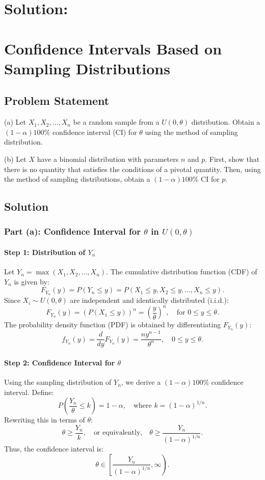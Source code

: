 \documentclass{article}
\begin{document}
\section*{Solution:}


\section*{Confidence Intervals Based on Sampling Distributions}

\subsection*{Problem Statement}
(a) Let \( X_1, X_2, \ldots, X_n \) be a random sample from a \( U(0, \theta) \) distribution. Obtain a \((1-\alpha)100\%\) confidence interval (CI) for \(\theta\) using the method of sampling distribution.

(b) Let \( X \) have a binomial distribution with parameters \( n \) and \( p \). First, show that there is no quantity that satisfies the conditions of a pivotal quantity. Then, using the method of sampling distributions, obtain a \((1-\alpha)100\%\) CI for \( p \).

\subsection*{Solution}

\subsubsection*{Part (a): Confidence Interval for \(\theta\) in \( U(0, \theta) \)}

\paragraph{Step 1: Distribution of \( Y_n \)}
Let \( Y_n = \max(X_1, X_2, \ldots, X_n) \). The cumulative distribution function (CDF) of \( Y_n \) is given by:
\[
F_{Y_n}(y) = P(Y_n \leq y) = P(X_1 \leq y, X_2 \leq y, \ldots, X_n \leq y).
\]
Since \( X_i \sim U(0, \theta) \) are independent and identically distributed (i.i.d.):
\[
F_{Y_n}(y) = \left(P(X_1 \leq y)\right)^n = \left(\frac{y}{\theta}\right)^n, \quad \text{for } 0 \leq y \leq \theta.
\]
The probability density function (PDF) is obtained by differentiating \( F_{Y_n}(y) \):
\[
f_{Y_n}(y) = \frac{d}{dy}F_{Y_n}(y) = \frac{n y^{n-1}}{\theta^n}, \quad 0 \leq y \leq \theta.
\]

\paragraph{Step 2: Confidence Interval for \(\theta\)}
Using the sampling distribution of \( Y_n \), we derive a \((1-\alpha)100\%\) confidence interval. Define:
\[
P\left(\frac{Y_n}{\theta} \leq k\right) = 1-\alpha, \quad \text{where } k = (1-\alpha)^{1/n}.
\]
Rewriting this in terms of \(\theta\):
\[
\theta \geq \frac{Y_n}{k}, \quad \text{or equivalently,} \quad \theta \geq \frac{Y_n}{(1-\alpha)^{1/n}}.
\]
Thus, the confidence interval is:
\[
\theta \in \left[\frac{Y_n}{(1-\alpha)^{1/n}}, \infty \right).
\]
\end{document}
